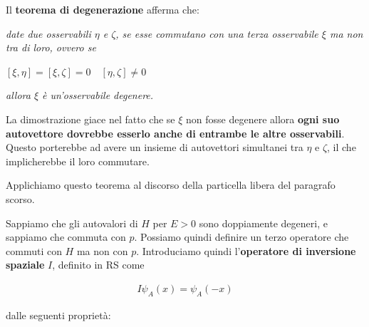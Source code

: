 Il \textbf{teorema di degenerazione} afferma che:

\textit{date due osservabili $\eta$ e $\zeta$, se esse commutano con una terza osservabile $\xi$ ma non tra di loro, ovvero se
}

\smallskip

$[\xi, \eta]=[\xi, \zeta]= 0 \quad [\eta, \zeta]\neq 0$

\smallskip

\textit{allora $\xi$ è un'osservabile degenere.}

\bigskip

La dimostrazione giace nel fatto che se $\xi$ non fosse degenere allora \textbf{ogni suo autovettore dovrebbe esserlo anche di entrambe le altre osservabili}. Questo porterebbe ad avere un insieme di autovettori simultanei tra $\eta$ e $\zeta$, il che implicherebbe il loro commutare.

\bigskip

Applichiamo questo teorema al discorso della particella libera del paragrafo scorso. 

Sappiamo che gli autovalori di $H$ per $E>0$ sono doppiamente degeneri, e sappiamo che commuta con $p$. Possiamo quindi definire un terzo operatore che commuti con $H$ ma non con $p$. Introduciamo quindi l'\textbf{operatore di inversione spaziale}
$I$, definito in RS come

\begin{align}
I\psi_A(x)=\psi_A(-x)
\end{align}

dalle seguenti proprietà:

